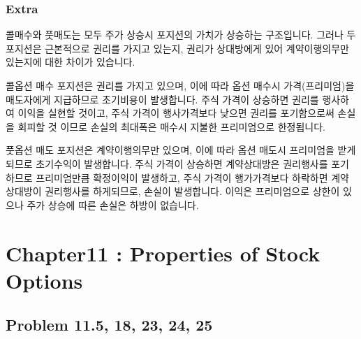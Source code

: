 \documentclass[
  letterpaper,
  DIV=11,
  numbers=noendperiod]{scrreprt}
\begin{document}
\subsubsection*{\texorpdfstring{\textbf{Extra}}{Extra}}\label{extra}

콜매수와 풋매도는 모두 주가 상승시 포지션의 가치가 상승하는 구조입니다.
그러나 두 포지션은 근본적으로 권리를 가지고 있는지, 권리가 상대방에게
있어 계약이행의무만 있는지에 대한 차이가 있습니다.

콜옵션 매수 포지션은 권리를 가지고 있으며, 이에 따라 옵션 매수시
가격(프리미엄)을 매도자에게 지급하므로 초기비용이 발생합니다. 주식
가격이 상승하면 권리를 행사하여 이익을 실현할 것이고, 주식 가격이
행사가격보다 낮으면 권리를 포기함으로써 손실을 회피할 것 이므로 손실의
최대폭은 매수시 지불한 프리미엄으로 한정됩니다.

풋옵션 매도 포지션은 계약이행의무만 있으며, 이에 따라 옵션 매도시
프리미엄을 받게 되므로 초기수익이 발생합니다. 주식 가격이 상승하면
계약상대방은 권리행사를 포기하므로 프리미엄만큼 확정이익이 발생하고,
주식 가격이 행가가격보다 하락하면 계약상대방이 권리행사를 하게되므로,
손실이 발생합니다. 이익은 프리미엄으로 상한이 있으나 주가 상승에 따른
손실은 하방이 없습니다.

\section*{Chapter11 : Properties of Stock
Options}\label{chapter11-properties-of-stock-options}


\subsection*{\texorpdfstring{\textbf{Problem 11.5, 18, 23, 24,
25}}{Problem 11.5, 18, 23, 24, 25}}\label{problem-11.5-18-23-24-25}
\end{document}
